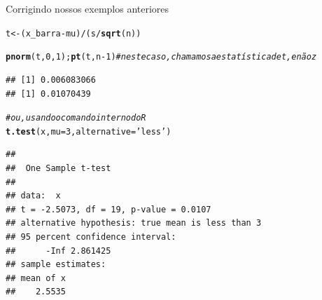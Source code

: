 \documentclass{beamer}\usepackage[]{graphicx}\usepackage[]{color}
\makeatletter
\newcommand{\hlnum}[1]{\textcolor[rgb]{0.686,0.059,0.569}{#1}}%
\newcommand{\hlstr}[1]{\textcolor[rgb]{0.192,0.494,0.8}{#1}}%
\newcommand{\hlcom}[1]{\textcolor[rgb]{0.678,0.584,0.686}{\textit{#1}}}%
\newcommand{\hlopt}[1]{\textcolor[rgb]{0,0,0}{#1}}%
\newcommand{\hlstd}[1]{\textcolor[rgb]{0.345,0.345,0.345}{#1}}%
\newcommand{\hlkwb}[1]{\textcolor[rgb]{0.69,0.353,0.396}{#1}}%
\newcommand{\hlkwc}[1]{\textcolor[rgb]{0.333,0.667,0.333}{#1}}%
\newcommand{\hlkwd}[1]{\textcolor[rgb]{0.737,0.353,0.396}{\textbf{#1}}}%
\newenvironment{kframe}{%
 \def\at@end@of@kframe{}%
 \ifinner\ifhmode%
  \def\at@end@of@kframe{\end{minipage}}%
  \begin{minipage}{\columnwidth}%
 \fi\fi%
 \def\FrameCommand##1{\hskip\@totalleftmargin \hskip-\fboxsep
 \colorbox{shadecolor}{##1}\hskip-\fboxsep
     \hskip-\linewidth \hskip-\@totalleftmargin \hskip\columnwidth}%
 \MakeFramed {\advance\hsize-\width
   \@totalleftmargin\z@ \linewidth\hsize
   \@setminipage}}%
 {\par\unskip\endMakeFramed%
 \at@end@of@kframe}
\newenvironment{knitrout}{}{} %
\renewenvironment{knitrout}{\setlength{\topsep}{0mm}}{}
\makeatother
\begin{document}
\begin{frame}[fragile]{Corrigindo nossos exemplos anteriores}

\begin{knitrout}\tiny
{}\color{fgcolor}\begin{kframe}
\begin{alltt}
\hlstd{t} \hlkwb{<-} \hlstd{(x_barra}\hlopt{-}\hlstd{mu)}\hlopt{/}\hlstd{(s}\hlopt{/}\hlkwd{sqrt}\hlstd{(n))}

\hlkwd{pnorm}\hlstd{(t,}\hlnum{0}\hlstd{,}\hlnum{1}\hlstd{);}\hlkwd{pt}\hlstd{(t,n}\hlopt{-}\hlnum{1}\hlstd{)} \hlcom{# neste caso, chamamos a estatística de t, e não z}
\end{alltt}
\begin{verbatim}
## [1] 0.006083066
## [1] 0.01070439
\end{verbatim}
\begin{alltt}
\hlcom{# ou, usando o comando interno do R}
\hlkwd{t.test}\hlstd{(x,}\hlkwc{mu}\hlstd{=}\hlnum{3}\hlstd{,}\hlkwc{alternative}\hlstd{=}\hlstr{'less'}\hlstd{)}
\end{alltt}
\begin{verbatim}
## 
## 	One Sample t-test
## 
## data:  x
## t = -2.5073, df = 19, p-value = 0.0107
## alternative hypothesis: true mean is less than 3
## 95 percent confidence interval:
##      -Inf 2.861425
## sample estimates:
## mean of x 
##    2.5535
\end{verbatim}
\end{kframe}
\end{knitrout}
\end{frame} 
\end{document}
